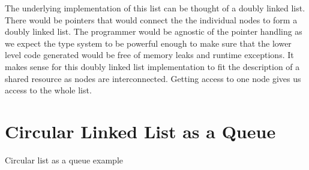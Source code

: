 The underlying implementation of this list can be thought of a doubly
linked list. There would be pointers that would connect the the individual nodes to form a doubly linked list.
The programmer would be agnostic of the pointer handling as we expect the type system to be powerful enough to
make sure that the lower level code generated would be free of memory leaks and runtime exceptions.
It makes sense for this doubly linked list implementation to fit the description of a shared resource as nodes
are interconnected. Getting access to one node gives us access to the whole list.



\section{Circular Linked List as a Queue}\label{sec:queue-example}

Circular list as a queue example


